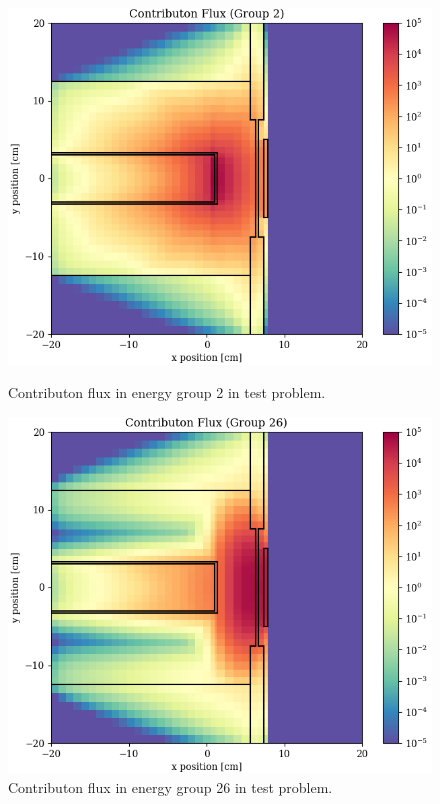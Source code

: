 \begin{figure}
  \begin{minipage}{0.49\linewidth}
    \centering
    \includegraphics[width=\linewidth]{content/testprob/scalar_flux_con_g02.png}
    \caption{Contributon flux in energy group 2 in test problem.}
    \label{fig:tp:scalar_flux_con_g02}
  \end{minipage}
  \hfill
  \begin{minipage}{0.49\linewidth}
    \centering
    \includegraphics[width=\linewidth]{content/testprob/scalar_flux_con_g26.png}
    \caption{Contributon flux in energy group 26 in test problem.}
    \label{fig:tp:scalar_flux_con_g26}
  \end{minipage}
\end{figure}
